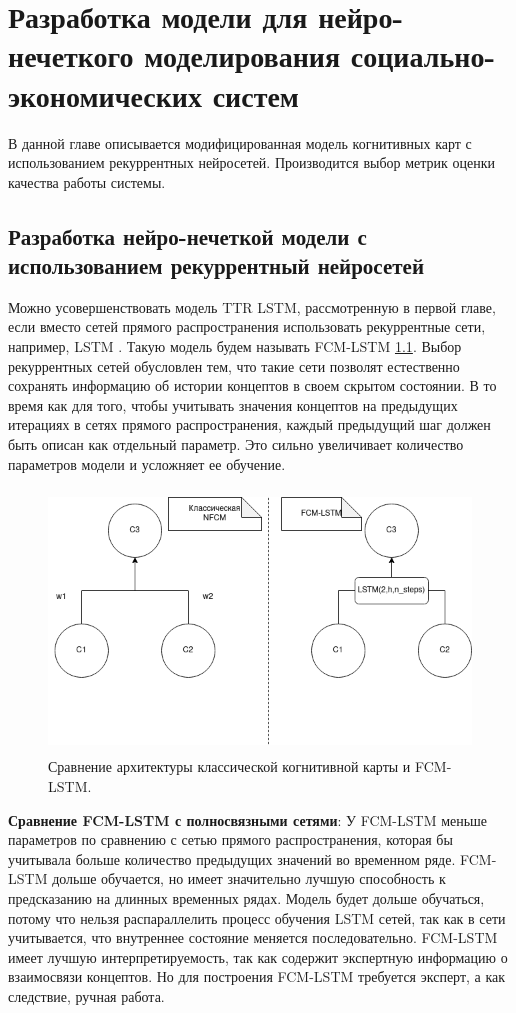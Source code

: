 \chapter{Разработка модели для нейро-нечеткого моделирования социально-экономических систем}

В данной главе описывается модифицированная модель
когнитивных карт с использованием рекуррентных нейросетей.
Производится выбор метрик оценки качества работы системы.

\section{Разработка нейро-нечеткой модели с использованием рекуррентный нейросетей}

Можно усовершенствовать модель TTR LSTM, рассмотренную в первой главе,
если вместо сетей прямого распространения использовать рекуррентные сети,
например, LSTM \cite{LSTM_paper}. Такую модель будем называть FCM-LSTM \ref{img:nfcm_compare_with_classif_fcm}.
Выбор рекуррентных сетей обусловлен тем, что такие сети позволят естественно сохранять информацию об
истории концептов в своем скрытом состоянии. В то время как для
того, чтобы учитывать значения концептов на предыдущих итерациях
в сетях прямого распространения, каждый предыдущий шаг должен быть
описан как отдельный параметр. Это сильно увеличивает количество параметров
модели и усложняет ее обучение.

\def\figurename{Рис}
\begin{figure}[t]
	\centering
	\includegraphics[height=7cm]{./img/fcm_lstm_scheme.png}
	\caption{Сравнение архитектуры классической когнитивной карты и FCM-LSTM. }
	\label{img:nfcm_compare_with_classif_fcm}
\end{figure}

\textbf{Сравнение FCM-LSTM с полносвязными сетями}:
У FCM-LSTM меньше параметров по сравнению с сетью прямого распространения,
которая бы учитывала больше количество предыдущих значений во временном ряде.
FCM-LSTM дольше обучается, но имеет значительно лучшую способность к предсказанию
на длинных временных рядах.
Модель будет дольше обучаться, потому что нельзя распараллелить
процесс обучения LSTM сетей, так как в сети учитывается, что внутреннее состояние меняется последовательно.
FCM-LSTM имеет лучшую интерпретируемость, так как содержит
экспертную информацию о взаимосвязи концептов.
Но для построения FCM-LSTM требуется эксперт, а как следствие,
ручная работа.

